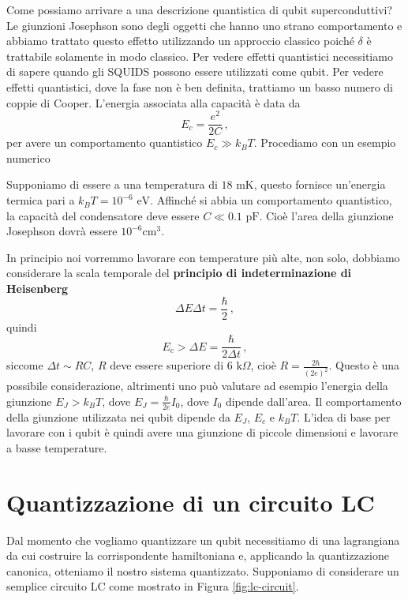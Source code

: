 \vspace{1cm}
\newline
{}
\noindent Come possiamo arrivare a una descrizione quantistica di qubit superconduttivi? Le giunzioni Josephson sono degli oggetti che hanno uno strano comportamento e abbiamo trattato questo effetto utilizzando un approccio classico poiché $\delta$ è trattabile solamente in modo classico. Per vedere effetti quantistici necessitiamo di sapere quando gli SQUIDS possono essere utilizzati come qubit. Per vedere effetti quantistici, dove la fase non è ben definita, trattiamo un basso numero di coppie di Cooper. L'energia associata alla capacità è data da
\begin{equation*}
    E_c=\frac{e^2}{2C} \, ,
\end{equation*}
per avere un comportamento quantistico $E_c\gg k_BT$. Procediamo con un esempio numerico
\begin{esempio}
    Supponiamo di essere a una temperatura di $18 \text{ mK}$, questo fornisce un'energia termica pari a $k_BT=10^{-6} \text{ eV}$. Affinché si abbia un comportamento quantistico, la capacità del condensatore deve essere $C \ll 0.1 \text{ pF}$. Cioè l'area della giunzione Josephson dovrà essere $10^{-6} \text{cm}^3$.
\end{esempio}
\noindent In principio noi vorremmo lavorare con temperature più alte, non solo, dobbiamo considerare la scala temporale del \textbf{principio di indeterminazione di Heisenberg}
\begin{equation*}
    \Delta E \Delta t = \frac \hbar 2 \, ,
\end{equation*}
quindi
\begin{equation*}
    E_c > \Delta E =\frac{\hbar}{2\Delta t} \, ,
\end{equation*}
siccome $\Delta t \sim RC$, $R$ deve essere superiore di $6 \text{ k}\Omega$, cioè $R=\frac{2\hbar}{(2e)^2}$. Questo è una possibile considerazione, altrimenti uno può valutare ad esempio l'energia della giunzione $E_J > k_BT$, dove $E_J = \frac{\hbar}{2e}I_0$, dove $I_0$ dipende dall'area. Il comportamento della giunzione utilizzata nei qubit dipende da $E_J$, $E_c$ e $k_BT$. L'idea di base per lavorare con i qubit è quindi avere una giunzione di piccole dimensioni e lavorare a basse temperature.

\section{Quantizzazione di un circuito LC}
Dal momento che vogliamo quantizzare un qubit necessitiamo di una lagrangiana da cui costruire la corrispondente hamiltoniana e, applicando la quantizzazione canonica, otteniamo il nostro sistema quantizzato.
Supponiamo di considerare un semplice circuito LC come mostrato in Figura \ref{fig:lc-circuit}.

